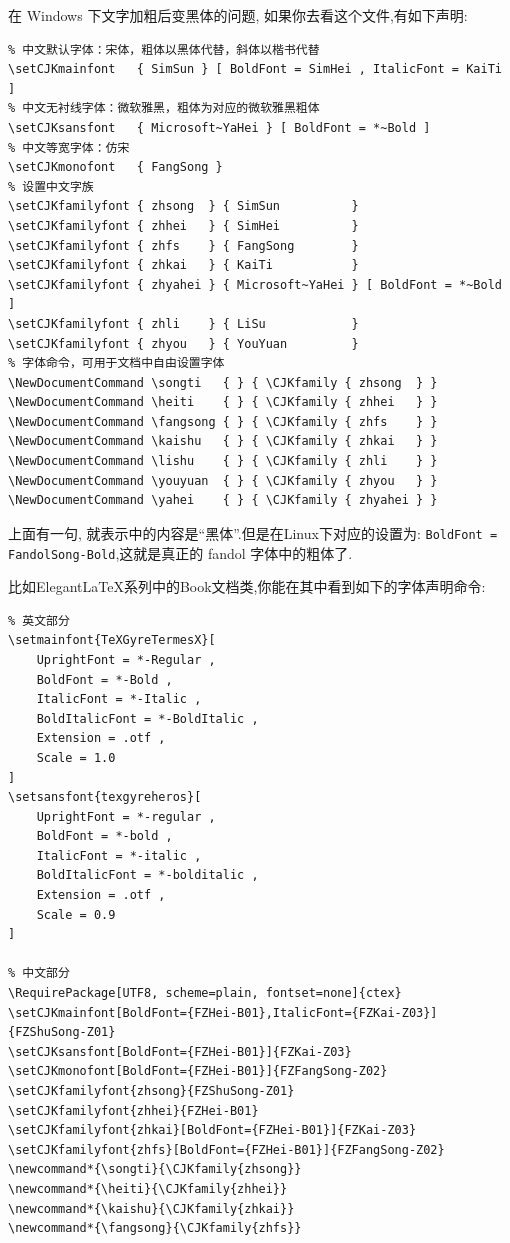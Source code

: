在 Windows 下文字加粗后变黑体的问题,
如果你去看这个文件,有如下声明:
\begin{verbatim}
% 中文默认字体：宋体，粗体以黑体代替，斜体以楷书代替
\setCJKmainfont   { SimSun } [ BoldFont = SimHei , ItalicFont = KaiTi ]
% 中文无衬线字体：微软雅黑，粗体为对应的微软雅黑粗体
\setCJKsansfont   { Microsoft~YaHei } [ BoldFont = *~Bold ]
% 中文等宽字体：仿宋
\setCJKmonofont   { FangSong }
% 设置中文字族
\setCJKfamilyfont { zhsong  } { SimSun          }
\setCJKfamilyfont { zhhei   } { SimHei          }
\setCJKfamilyfont { zhfs    } { FangSong        }
\setCJKfamilyfont { zhkai   } { KaiTi           }
\setCJKfamilyfont { zhyahei } { Microsoft~YaHei } [ BoldFont = *~Bold ]
\setCJKfamilyfont { zhli    } { LiSu            }
\setCJKfamilyfont { zhyou   } { YouYuan         }
% 字体命令，可用于文档中自由设置字体
\NewDocumentCommand \songti   { } { \CJKfamily { zhsong  } }
\NewDocumentCommand \heiti    { } { \CJKfamily { zhhei   } }
\NewDocumentCommand \fangsong { } { \CJKfamily { zhfs    } }
\NewDocumentCommand \kaishu   { } { \CJKfamily { zhkai   } }
\NewDocumentCommand \lishu    { } { \CJKfamily { zhli    } }
\NewDocumentCommand \youyuan  { } { \CJKfamily { zhyou   } }
\NewDocumentCommand \yahei    { } { \CJKfamily { zhyahei } }
\end{verbatim}

上面有一句, 就表示中的内容是``黑体''.但是在Linux下对应的设置为:
\texttt{BoldFont = FandolSong-Bold},这就是真正的 fandol 字体中的粗体了.

比如Elegant\LaTeX{}系列中的Book文档类,你能在其中看到如下的字体声明命令:
\begin{verbatim}
% 英文部分
\setmainfont{TeXGyreTermesX}[
    UprightFont = *-Regular ,
    BoldFont = *-Bold ,
    ItalicFont = *-Italic ,
    BoldItalicFont = *-BoldItalic ,
    Extension = .otf ,
    Scale = 1.0
]
\setsansfont{texgyreheros}[
    UprightFont = *-regular ,
    BoldFont = *-bold ,
    ItalicFont = *-italic ,
    BoldItalicFont = *-bolditalic ,
    Extension = .otf ,
    Scale = 0.9
]

% 中文部分
\RequirePackage[UTF8, scheme=plain, fontset=none]{ctex}
\setCJKmainfont[BoldFont={FZHei-B01},ItalicFont={FZKai-Z03}]{FZShuSong-Z01}
\setCJKsansfont[BoldFont={FZHei-B01}]{FZKai-Z03}
\setCJKmonofont[BoldFont={FZHei-B01}]{FZFangSong-Z02}
\setCJKfamilyfont{zhsong}{FZShuSong-Z01}
\setCJKfamilyfont{zhhei}{FZHei-B01}
\setCJKfamilyfont{zhkai}[BoldFont={FZHei-B01}]{FZKai-Z03}
\setCJKfamilyfont{zhfs}[BoldFont={FZHei-B01}]{FZFangSong-Z02}
\newcommand*{\songti}{\CJKfamily{zhsong}}
\newcommand*{\heiti}{\CJKfamily{zhhei}}
\newcommand*{\kaishu}{\CJKfamily{zhkai}}
\newcommand*{\fangsong}{\CJKfamily{zhfs}}
\end{verbatim}

